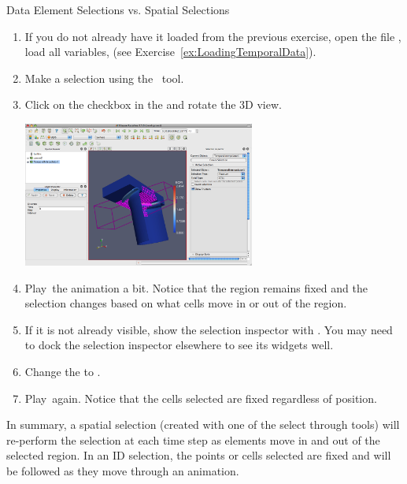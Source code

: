 \begin{exercise}{Data Element Selections vs. Spatial Selections}
  \label{ex:DataElementSelectionsVsSpatialSelections}%

  \begin{enumerate}
  \item If you do not already have it loaded from the previous exercise,
    open the file , load all variables, \apply (see
    Exercise~\ref{ex:LoadingTemporalData}).
  \item Make a selection using the ~\selectCellsThrough tool.
  \item Click on the  checkbox in the  and rotate the 3D view.

    \begin{inlinefig}
      \includegraphics[width=3in]{images/SelectionFrustum}
    \end{inlinefig}

  \item Play~\vcrPlay the animation a bit.  Notice that the region remains
    fixed and the selection changes based on what cells move in or out of
    the region.
  \item If it is not already visible, show the selection inspector
    with  \ra {}.  You may need to dock
    the selection inspector elsewhere to see its widgets well.
  \item Change the  to .
  \item Play~\vcrPlay again.  Notice that the cells selected are fixed
    regardless of position.
  \end{enumerate}

  In summary, a spatial selection (created with one of the select through
  tools) will re-perform the selection at each time step as elements move
  in and out of the selected region.  In an ID selection, the points or
  cells selected are fixed and will be followed as they move through an
  animation.
\end{exercise}

